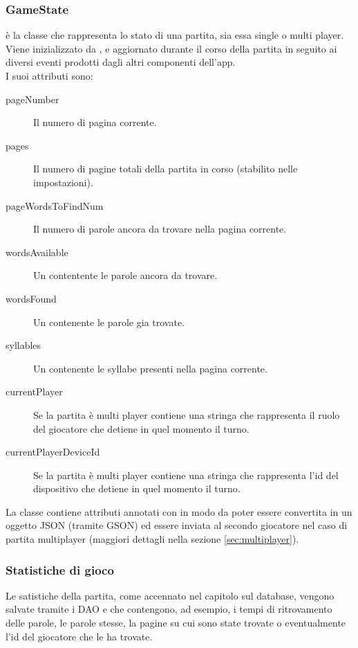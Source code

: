 \subsubsection{GameState}
\label{sec:game_state}
 è la classe che rappresenta lo stato di una partita, sia essa single o multi player. Viene inizializzato da , e aggiornato durante il corso della partita in seguito ai diversi eventi prodotti dagli altri componenti dell'app.\\
I suoi attributi sono:
\begin{description}
    \item[pageNumber] Il numero di pagina corrente.
    \item[pages] Il numero di pagine totali della partita in corso (stabilito nelle impostazioni).
    \item[pageWordsToFindNum] Il numero di parole ancora da trovare nella pagina corrente.
    \item[wordsAvailable] Un  contentente le parole ancora da trovare.
    \item[wordsFound] Un  contenente le parole gia trovate.
    \item[syllables] Un  contenente le syllabe presenti nella pagina corrente.
    \item[currentPlayer] Se la partita è multi player contiene una stringa che rappresenta il ruolo del giocatore che detiene in quel momento il turno.
    \item[currentPlayerDeviceId] Se la partita è multi player contiene una stringa che rappresenta l'id del dispositivo che detiene in quel momento il turno.
\end{description}

La classe  contiene attributi annotati con  in modo da poter essere convertita in un oggetto JSON (tramite GSON) ed essere inviata al secondo giocatore nel caso di partita multiplayer (maggiori dettagli nella sezione \ref{sec:multiplayer}).

\subsubsection{Statistiche di gioco}
\label{sec:stats}
Le satistiche della partita, come accennato nel capitolo sul database, vengono salvate tramite i DAO  e  che contengono, ad esempio, i tempi di ritrovamento delle parole, le parole stesse, la pagine su cui sono state trovate o eventualmente l'id del giocatore che le ha trovate.

